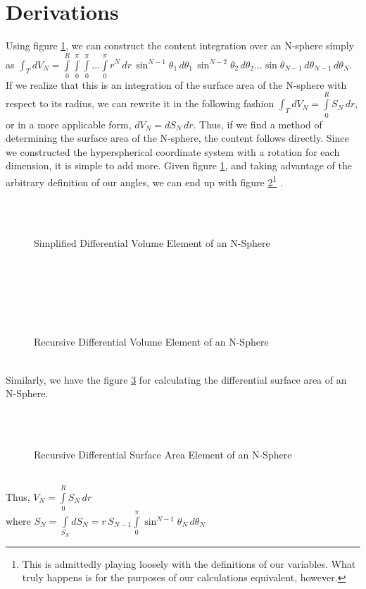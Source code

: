 \documentclass [letterpaper]{article}
\begin{document}
\section{Derivations}
Using figure \ref{fig:eqdvsimple}, we can construct the content integration over an N-sphere simply as $\int_TdV_N=\int\limits_{0}^R\int\limits_0^\pi\int\limits_0^\pi\dots\int\limits_0^\pi r^N\,dr\,\sin^{N-1}\theta_1\,d\theta_1\,\sin^{N-2}\theta_2\,d\theta_2\dots\sin\theta_{N-1}\,d\theta_{N-1}\,d\theta_N$. If we realize that this is an integration of the surface area of the N-sphere with respect to its radius, we can rewrite it in the following fashion $\int_TdV_N=\int\limits_0^RS_N\,dr$, or in a more applicable form, $dV_N=dS_N\,dr$. Thus, if we find a method of determining the surface area of the N-sphere, the content follows directly. Since we constructed the hyperspherical coordinate system with a rotation for each dimension, it is simple to add more. Given figure \ref{fig:eqdvsimple}, and taking advantage of the arbitrary definition of our angles, we can end up with figure \ref{fig:eqdvreq}\footnote{This is admittedly playing loosely with the definitions of our variables. What truly happens is for the purposes of our calculations equivalent, however.}
.\\
\begin{figure}[h]
\\
\\
\caption{\label{fig:eqdvsimple}Simplified Differential Volume Element of an N-Sphere}
\end{figure}\\
\begin{figure}[h]
\\
\\
\\
\caption{\label{fig:eqdvreq}Recursive Differential Volume Element of an N-Sphere}
\end{figure}\\
Similarly, we have the figure \ref{fig:eqdsreq} for calculating the differential surface area of an N-Sphere.\\
\begin{figure}[h]
\\
\\
\caption{\label{fig:eqdsreq}Recursive Differential Surface Area Element of an N-Sphere}
\end{figure}\\
Thus, $V_N=\int\limits_{0}^RS_{N}\,dr$\\ where $S_N=\int\limits_{S_N}dS_N=r\,S_{N-1}\int\limits_0^\pi\sin^{N-1}\theta_N\,d\theta_N$\newpage
\end{document}
